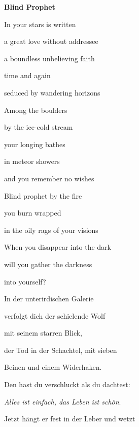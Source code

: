 \bigskip


\bigskip


\bigskip


\bigskip


\bigskip


\bigskip


\bigskip


\bigskip

{\bfseries
Blind Prophet}


\bigskip


\bigskip

In your stars is written

a great love without addressee

a boundless unbelieving faith

time and again 

seduced by wandering horizons


\bigskip

Among the boulders

by the ice-cold stream

your longing bathes 

in meteor showers

and you remember no wishes


\bigskip

Blind prophet by the fire

you burn wrapped 

in the oily rags of your visions


\bigskip

When you disappear into the dark

will you gather the darkness 

into yourself?


\bigskip



\bigskip


\bigskip

In der unterirdischen Galerie 

verfolgt dich der schielende Wolf

mit seinem starren Blick,

der Tod in der Schachtel, mit sieben 

Beinen und einem Widerhaken. 

Den hast du verschluckt als du dachtest:

\emph{Alles ist einfach, das Leben ist schön}.

Jetzt hängt er fest in der Leber und wetzt

